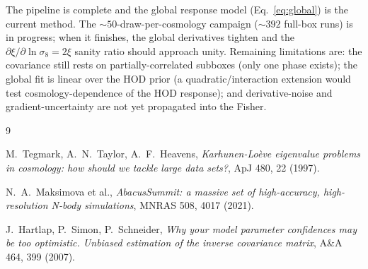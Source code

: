 \documentclass[11pt]{article}
\begin{document}
The pipeline is complete and the global response model (Eq.~\ref{eq:global})
is the current method.  The $\sim 50$-draw-per-cosmology campaign
($\sim 392$ full-box runs) is in progress; when it finishes, the global
derivatives tighten and the $\partial\xi/\partial\ln\sigma_8 = 2\xi$ sanity
ratio should approach unity.  Remaining limitations are: the covariance
still rests on partially-correlated subboxes (only one phase exists); the
global fit is linear over the HOD prior (a quadratic/interaction extension
would test cosmology-dependence of the HOD response); and derivative-noise
and gradient-uncertainty are not yet propagated into the Fisher.

\begin{thebibliography}{9}

M.~Tegmark, A.~N.~Taylor, A.~F.~Heavens,
\emph{Karhunen-Lo\`eve eigenvalue problems in cosmology: how should we
tackle large data sets?}, ApJ 480, 22 (1997).

N.~A.~Maksimova et al.,
\emph{AbacusSummit: a massive set of high-accuracy, high-resolution
N-body simulations}, MNRAS 508, 4017 (2021).

J.~Hartlap, P.~Simon, P.~Schneider,
\emph{Why your model parameter confidences may be too optimistic.
Unbiased estimation of the inverse covariance matrix},
A\&A 464, 399 (2007).

\end{thebibliography}
\end{document}
